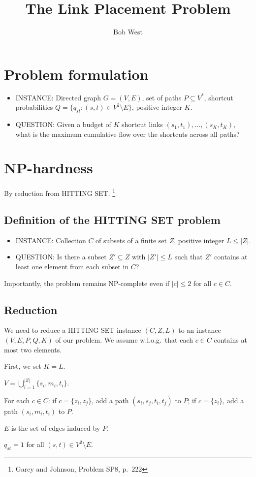 \documentclass[12pt,letterpaper]{article}
\begin{document}
\title{The Link Placement Problem}
\author{Bob West}
\maketitle

\section{Problem formulation}

\begin{itemize}
\item INSTANCE: Directed graph $G=(V,E)$, set of paths $P \subseteq V^*$, shortcut probabilities $Q=\{q_{st} : (s,t) \in V^2 \setminus E\}$, positive integer $K$.
\item QUESTION: Given a budget of $K$ shortcut links $(s_1,t_1), \dots, (s_K,t_K)$, what is the maximum cumulative flow over the shortcuts across all paths?
\end{itemize}

\section{NP-hardness}

By reduction from HITTING SET.%
\footnote{Garey and Johnson, Problem SP8, p.~222}

\subsection{Definition of the HITTING SET problem}

\begin{itemize}
\item INSTANCE: Collection $C$ of subsets of a finite set $Z$, positive integer $L \leq |Z|$.
\item QUESTION: Is there a subset $Z' \subseteq Z$ with $|Z'| \leq L$ such that $Z'$ contains at least one element from each subset in $C$?
\end{itemize}

Importantly, the problem remains NP-complete even if $|c| \leq 2$ for all $c \in C$.

\subsection{Reduction}

We need to reduce a HITTING SET instance $(C,Z,L)$ to an instance $(V,E,P,Q,K)$ of our problem.
We assume w.l.o.g.\ that each $c \in C$ contains at most two elements.

First, we set $K=L$.

$V=\bigcup_{i=1}^{|Z|} \{s_i, m_i, t_i\}$.

For each $c \in C$: if $c=\{z_i,z_j\}$, add a path $(s_i,s_j,t_i,t_j)$ to $P$; if $c=\{z_i\}$, add a path $(s_i,m_i,t_i)$ to $P$.

$E$ is the set of edges induced by $P$.

$q_{st}=1$ for all $(s,t) \in V^2 \setminus E$.
\end{document}
